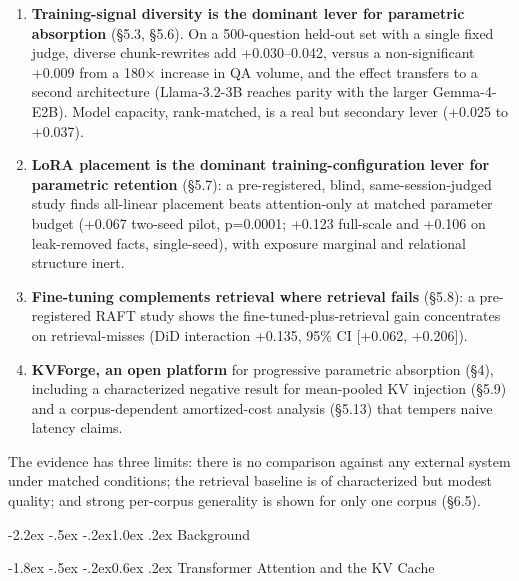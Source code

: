 \documentclass[10pt,twocolumn]{article}
\makeatletter
\providecommand{\tightlist}{\setlength{\itemsep}{0pt}\setlength{\parskip}{0pt}}
\renewcommand\section{\@startsection{section}{1}{\z@}%
  {-2.2ex \@plus -.5ex \@minus -.2ex}{1.0ex \@plus .2ex}%
  {\normalfont\large\bfseries}}
\renewcommand\subsection{\@startsection{subsection}{2}{\z@}%
  {-1.8ex \@plus -.5ex \@minus -.2ex}{0.6ex \@plus .2ex}%
  {\normalfont\normalsize\bfseries}}
\makeatother
\begin{document}
\begin{enumerate}
\def\labelenumi{\arabic{enumi}.}
\tightlist
\item
  \textbf{Training-signal diversity is the dominant lever for parametric absorption} (§5.3, §5.6). On a 500-question held-out set with a single fixed judge, diverse chunk-rewrites add +0.030--0.042, versus a non-significant +0.009 from a 180× increase in QA volume, and the effect transfers to a second architecture (Llama-3.2-3B reaches parity with the larger Gemma-4-E2B). Model capacity, rank-matched, is a real but secondary lever (+0.025 to +0.037).
\item
  \textbf{LoRA placement is the dominant training-configuration lever for parametric retention} (§5.7): a pre-registered, blind, same-session-judged study finds all-linear placement beats attention-only at matched parameter budget (+0.067 two-seed pilot, p=0.0001; +0.123 full-scale and +0.106 on leak-removed facts, single-seed), with exposure marginal and relational structure inert.
\item
  \textbf{Fine-tuning complements retrieval where retrieval fails} (§5.8): a pre-registered RAFT study shows the fine-tuned-plus-retrieval gain concentrates on retrieval-misses (DiD interaction +0.135, 95\% CI {[}+0.062, +0.206{]}).
\item
  \textbf{KVForge, an open platform} for progressive parametric absorption (§4), including a characterized negative result for mean-pooled KV injection (§5.9) and a corpus-dependent amortized-cost analysis (§5.13) that tempers naive latency claims.
\end{enumerate}

The evidence has three limits: there is no comparison against any external system under matched conditions; the retrieval baseline is of characterized but modest quality; and strong per-corpus generality is shown for only one corpus (§6.5).

\hypertarget{background}{%
\section{Background}\label{background}}

\hypertarget{transformer-attention-and-the-kv-cache}{%
\subsection{Transformer Attention and the KV Cache}\label{transformer-attention-and-the-kv-cache}}
\end{document}
